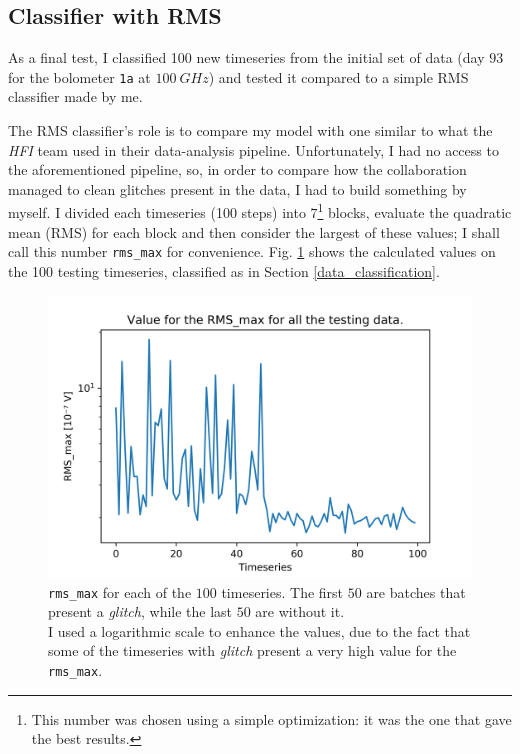 \documentclass[12pt,a4paper,final]{book}			%
\begin{document}
			\subsection{Classifier with RMS}\label{classifier_with_rms}
			As a final test, I classified 100 new timeseries from the initial set of data (day $93$ for the bolometer \texttt{1a} at $100~\unit{GHz}$) and tested it compared to a simple RMS classifier made by me.			
			
			The RMS classifier's role is to compare my model with one similar to what the \textit{HFI} team used in their data-analysis pipeline. Unfortunately, I had no access to the aforementioned pipeline, so, in order to compare how the collaboration managed to clean glitches present in the data, I had to build something by myself. \cite{planck_glitches}
			I divided each timeseries (100 steps) into $7$\footnote{This number was chosen using a simple optimization: it was the one that gave the best results.} blocks, evaluate the quadratic mean (RMS) for each block and then consider the largest of these values; I shall call this number \texttt{rms\_max} for convenience. Fig. \ref{rms_max_plot} shows the calculated values on the 100 testing timeseries, classified as in Section \ref{data_classification}. 
			\begin{figure}[h!]
			\centering
				\includegraphics[scale=0.65]{figures/rms_max.png}
				\caption{\texttt{rms\_max} for each of the $100$ timeseries. The first $50$ are batches that present a \textit{glitch}, while the last $50$ are without it.	\\
				I used a logarithmic scale to enhance the values, due to the fact that some of the timeseries with \textit{glitch} present a very high value for the \texttt{rms\_max}.}
				\label{rms_max_plot} 
			\end{figure}
			
\end{document}
